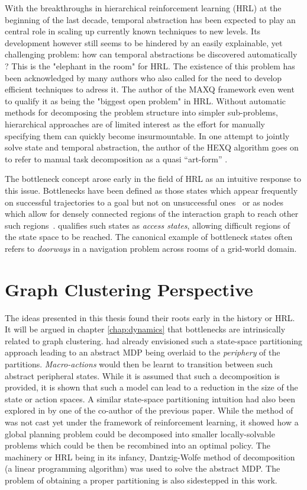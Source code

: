 With the breakthroughs in hierarchical reinforcement learning (HRL) at the beginning of the last
decade, temporal abstraction has been expected to play an central role in scaling up currently
known techniques to new levels. Its development however still seems to be hindered by an
easily explainable, yet challenging problem: how can temporal abstractions be discovered
automatically ? This is the "elephant in the room" for HRL. The existence of this problem has
been acknowledged by many authors who also called for the need to develop efficient
techniques to adress it. The author of the MAXQ framework even went to qualify it as being the
"biggest open problem" \cite{Dietterich2000} in HRL. Without automatic methods for
decomposing the problem structure into simpler sub-problems, hierarchical approaches are of
limited interest as the effort for manually specifying them can quickly become insurmountable. 
In one attempt to jointly solve state and temporal abstraction, the author of the HEXQ algorithm
goes on to refer to manual task decomposition as a quasi ``art-form'' \cite{Hengst2002}.

The bottleneck concept arose early in the field of HRL as an intuitive response to this issue. Bottlenecks have been defined as those states which appear frequently on successful trajectories to a goal but not on unsuccessful ones~\cite{Mcgovern2001, Stolle2002} or as nodes which allow for densely connected regions of the interaction graph to reach other such regions~\cite{Menache2002, Simsek2004, Kazemitabar2009}. \cite{Simsek2004} qualifies such states as \textit{access states}, allowing difficult regions of the state space to be reached. The canonical example of bottleneck states often refers to \textit{doorways} in a navigation problem across rooms of a grid-world domain.

\section{Graph Clustering Perspective}
The ideas presented in this thesis found their roots early in the history or HRL. It
will be argued in chapter \ref{chap:dynamics}  that bottlenecks are intrinsically related to graph
clustering. \cite{Hauskrecht1998} had already envisioned such a state-space partitioning
approach leading to an abstract MDP being overlaid to the \textit{periphery} of the partitions.
\textit{Macro-actions} would then be learnt to transition between such abstract peripheral
states. While it is assumed that such a decomposition is provided, it is shown that such a model
can lead to a reduction in the size of the state or action spaces. A similar state-space
partitioning intuition had also been explored in \cite{Dean1995} by one of the co-author of the
previous paper. While the method of \cite{Dean1995} was not cast yet under the framework of
reinforcement learning, it showed how a global planning problem could be decomposed into
smaller locally-solvable problems which could be then be recombined into an optimal policy.
The machinery or HRL being in its infancy, Dantzig-Wolfe method \cite{Dantzig1960} of
decomposition (a linear programming algorithm) was used to solve the abstract MDP. The
problem of obtaining a proper partitioning is also sidestepped in this work.

